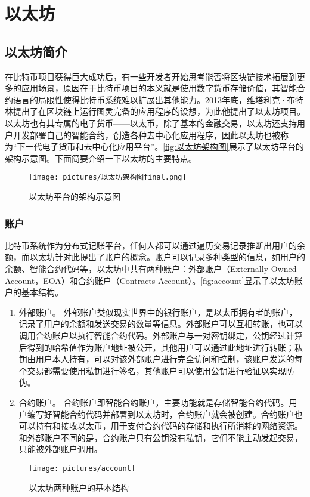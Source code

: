 \section{以太坊}
\label{sec:以太坊}
\subsection{以太坊简介}
\label{sec:以太坊简介}
在比特币项目获得巨大成功后，有一些开发者开始思考能否将区块链技术拓展到更多的应用场景，原因在于比特币项目的本义就是使用数字货币存储价值，其智能合约语言的局限性使得比特币系统难以扩展出其他能力。2013年底，维塔利克·布特林提出了在区块链上运行图灵完备的应用程序的设想，为此他提出了以太坊项目。以太坊也有其专属的电子货币——以太币，除了基本的金融交易，以太坊还支持用户开发部署自己的智能合约，创造各种去中心化应用程序，因此以太坊也被称为“下一代电子货币和去中心化应用平台”。\autoref{fig:以太坊架构图}展示了以太坊平台的架构示意图。下面简要介绍一下以太坊的主要特点。
\begin{figure}[htbp]
    \centering
    \texttt{[image: pictures/以太坊架构图final.png]}
    \caption{\label{fig:以太坊架构图}以太坊平台的架构示意图}
\end{figure}
\subsubsection{账户}
    
    比特币系统作为分布式记账平台，任何人都可以通过遍历交易记录推断出用户的余额，而以太坊针对此提出了账户的概念。账户可以记录多种类型的信息，如用户的余额、智能合约代码等，以太坊中共有两种账户：外部账户（Externally Owned Account，EOA）和合约账户（Contracts Account）。\autoref{fig:account}显示了以太坊账户的基本结构。
    \begin{enumerate}[label=(\arabic*)]
        \item 外部账户。
        外部账户类似现实世界中的银行账户，是以太币拥有者的账户，记录了用户的余额和发送交易的数量等信息。外部账户可以互相转账，也可以调用合约账户以执行智能合约代码。外部账户与一对密钥绑定，公钥经过计算后得到的哈希值作为账户地址被公开，其他用户可以通过此地址进行转账；私钥由用户本人持有，可以对该外部账户进行完全访问和控制，该账户发送的每个交易都需要使用私钥进行签名，其他账户可以使用公钥进行验证以实现防伪。
        \item 合约账户。
        合约账户即智能合约账户，主要功能就是存储智能合约代码。用户编写好智能合约代码并部署到以太坊时，合约账户就会被创建。合约账户也可以持有和接收以太币，用于支付合约代码的存储和执行所消耗的网络资源。和外部账户不同的是，合约账户只有公钥没有私钥，它们不能主动发起交易，只能被外部账户调用。
        
    \end{enumerate}
    \begin{figure}[htbp]
        \centering
        \texttt{[image: pictures/account]}
        \caption{\label{fig:account}以太坊两种账户的基本结构}
    \end{figure}

